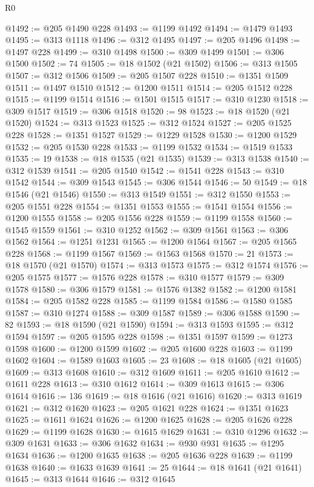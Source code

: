 \begin{lexlean}{R0}
\begin{coremodule}
@1492 := @205 @1490 @228
@1493 := @1199 @1492
@1494 := @1479 @1493
@1495 := @313 @1118
@1496 := @312 @1495
@1497 := @205 @1496
@1498 := @1497 @228
@1499 := @310 @1498
@1500 := @309 @1499
@1501 := @306 @1500
@1502 := 74
@1505 := @18 @1502 (@21 @1502)
@1506 := @313 @1505
@1507 := @312 @1506
@1509 := @205 @1507 @228
@1510 := @1351 @1509
@1511 := @1497 @1510
@1512 := @1200 @1511
@1514 := @205 @1512 @228
@1515 := @1199 @1514
@1516 := @1501 @1515
@1517 := @310 @1230
@1518 := @309 @1517
@1519 := @306 @1518
@1520 := 98
@1523 := @18 @1520 (@21 @1520)
@1524 := @313 @1523
@1525 := @312 @1524
@1527 := @205 @1525 @228
@1528 := @1351 @1527
@1529 := @1229 @1528
@1530 := @1200 @1529
@1532 := @205 @1530 @228
@1533 := @1199 @1532
@1534 := @1519 @1533
@1535 := 19
@1538 := @18 @1535 (@21 @1535)
@1539 := @313 @1538
@1540 := @312 @1539
@1541 := @205 @1540
@1542 := @1541 @228
@1543 := @310 @1542
@1544 := @309 @1543
@1545 := @306 @1544
@1546 := 50
@1549 := @18 @1546 (@21 @1546)
@1550 := @313 @1549
@1551 := @312 @1550
@1553 := @205 @1551 @228
@1554 := @1351 @1553
@1555 := @1541 @1554
@1556 := @1200 @1555
@1558 := @205 @1556 @228
@1559 := @1199 @1558
@1560 := @1545 @1559
@1561 := @310 @1252
@1562 := @309 @1561
@1563 := @306 @1562
@1564 := @1251 @1231
@1565 := @1200 @1564
@1567 := @205 @1565 @228
@1568 := @1199 @1567
@1569 := @1563 @1568
@1570 := 21
@1573 := @18 @1570 (@21 @1570)
@1574 := @313 @1573
@1575 := @312 @1574
@1576 := @205 @1575
@1577 := @1576 @228
@1578 := @310 @1577
@1579 := @309 @1578
@1580 := @306 @1579
@1581 := @1576 @1382
@1582 := @1200 @1581
@1584 := @205 @1582 @228
@1585 := @1199 @1584
@1586 := @1580 @1585
@1587 := @310 @1274
@1588 := @309 @1587
@1589 := @306 @1588
@1590 := 82
@1593 := @18 @1590 (@21 @1590)
@1594 := @313 @1593
@1595 := @312 @1594
@1597 := @205 @1595 @228
@1598 := @1351 @1597
@1599 := @1273 @1598
@1600 := @1200 @1599
@1602 := @205 @1600 @228
@1603 := @1199 @1602
@1604 := @1589 @1603
@1605 := 23
@1608 := @18 @1605 (@21 @1605)
@1609 := @313 @1608
@1610 := @312 @1609
@1611 := @205 @1610
@1612 := @1611 @228
@1613 := @310 @1612
@1614 := @309 @1613
@1615 := @306 @1614
@1616 := 136
@1619 := @18 @1616 (@21 @1616)
@1620 := @313 @1619
@1621 := @312 @1620
@1623 := @205 @1621 @228
@1624 := @1351 @1623
@1625 := @1611 @1624
@1626 := @1200 @1625
@1628 := @205 @1626 @228
@1629 := @1199 @1628
@1630 := @1615 @1629
@1631 := @310 @1296
@1632 := @309 @1631
@1633 := @306 @1632
@1634 := @930 @931
@1635 := @1295 @1634
@1636 := @1200 @1635
@1638 := @205 @1636 @228
@1639 := @1199 @1638
@1640 := @1633 @1639
@1641 := 25
@1644 := @18 @1641 (@21 @1641)
@1645 := @313 @1644
@1646 := @312 @1645

\end{coremodule}
\end{lexlean}
